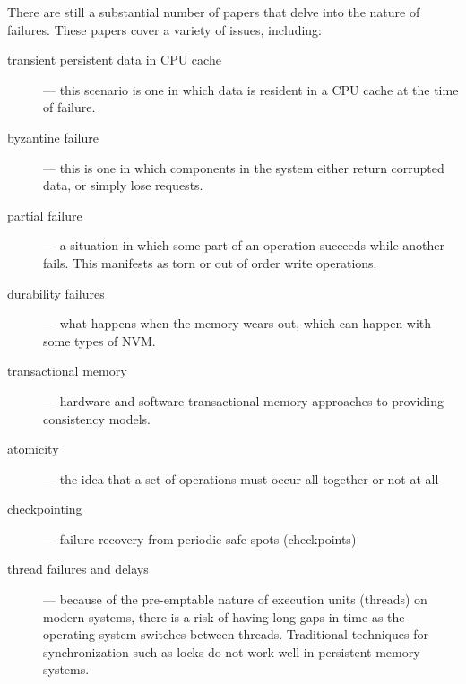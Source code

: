 There are still a substantial number of papers that delve into
the nature of failures.  These papers cover a variety of issues,
including:

\begin{description}
    \item[transient persistent data in CPU cache] --- this scenario is one in which data is resident in a CPU cache at the time of failure.~\cite{volos2011mnemosyne,chakrabarti2014atlas}  

    \item[byzantine failure] --- this is one in which components in the system either return corrupted data, or simply lose requests.~\cite{mahajan2011consistency} 
    
    \item[partial failure] --- a situation in which some part of an operation succeeds while another fails.  This manifests as torn or out of order write operations.~\cite{conway2012logic,Oukid:2014:SHS:2619228.2619236,joshi2015efficient,
    Oukid:2014:SHS:2619228.2619236,
    arulraj2015let,
    dulloor2015systems, pelley2014memory,Cohen:2017:ELN:3152284.3133891,chatzistergiou2015rewind,Nalli:2017:APM:3093337.3037730, xu2016nova,Hsu:2017:NPP:3064176.3064204}

    \item[durability failures] --- what happens when the memory wears out, which can happen with some types of NVM.~\cite{dulloor2014system}
    
    \item[transactional memory] --- hardware and software transactional memory approaches to providing consistency models.~\cite{leis2014exploiting,seo2017failure}

    \item[atomicity] --- the idea that a set of operations must occur all together or not at all~\cite{giles2015transaction, izraelevitz2016failure,marathe2017persistent,kim2018clfb,nawab2017dali,marathe2018persistent}
    
    \item[checkpointing] --- failure recovery from periodic safe spots (checkpoints)~\cite{ren2015thynvm}
    
    \item[thread failures and delays] --- because of the pre-emptable nature of execution units (threads) on modern systems, there is a risk of having long gaps in time as the operating system switches between threads.  Traditional techniques for synchronization such as locks do not work well in persistent memory systems.~\cite{herlihy2014future} 
    
\end{description}

